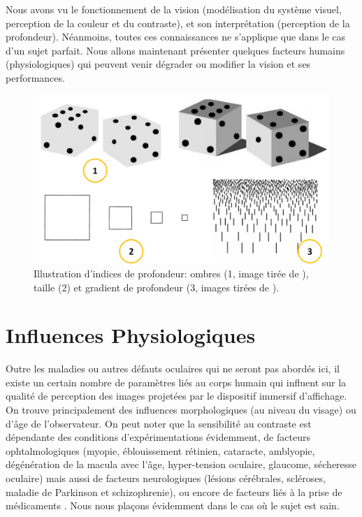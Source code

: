 	\par Nous avons vu le fonctionnement de la vision (modélisation du système visuel, perception de la couleur et du contraste), et son interprétation (perception de la profondeur). Néanmoins, toutes ces connaissances ne s'applique que dans le cas d'un sujet parfait. Nous allons maintenant présenter quelques facteurs humains (physiologiques) qui peuvent venir dégrader ou modifier la vision et ses performances.	
	
	\begin{figure}
		\centering
		\includegraphics[scale=.25]{Figures/PerspectivesProfondeur}
		\caption{Illustration d'indices de profondeur: ombres (1, image tirée de \citep{anses_effets_2014}), taille (2) et gradient de profondeur (3, images tirées de \citep{glassner_principles_1995}).}
		\label{fig:profondeur_perspectives}
	\end{figure}
	
\chapter{Influences Physiologiques}
	\par Outre les maladies ou autres défauts oculaires qui ne seront pas abordés ici, il existe un certain nombre de paramètres liés au corps humain qui influent sur la qualité de perception des images projetées par le dispositif immersif d'affichage. On trouve principalement des influences morphologiques (au niveau du visage) ou d'âge de l'observateur. On peut noter que la sensibilité au contraste est dépendante des conditions d'expérimentations évidemment, de facteurs ophtalmologiques (myopie, éblouissement rétinien, cataracte, amblyopie, dégénération de la macula avec l'âge, hyper-tension oculaire, glaucome, sécheresse oculaire) mais aussi de facteurs neurologiques (lésions cérébrales, scléroses, maladie de Parkinson et schizophrenie), ou encore de facteurs liés à la prise de médicaments \citep{pelli_measuring_2013}. Nous nous plaçons évidemment dans le cas où le sujet est sain.
		
